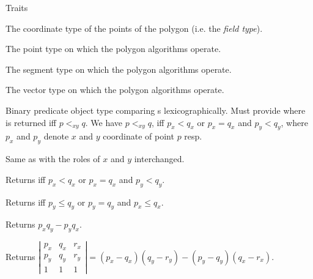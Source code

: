 \begin{ccClass} {Traits}

\ccTypes
{}
        {The coordinate type of the points of the polygon (i.e. the {\em field type}).}

        {The point type on which the polygon algorithms operate.}

        {The segment type on which the polygon algorithms operate.}

        {The vector type on which the polygon algorithms operate.}

       {Binary predicate object type comparing s lexicographically.
        Must provide  where 
        is returned iff $p <_{xy} q$.
        We have $p<_{xy}q$, iff $p_x < q_x$ or $p_x = q_x$ and $p_y < q_y$,
        where $p_x$ and $p_y$ denote $x$ and $y$ coordinate of point $p$ resp.
       }

       {Same as  with the roles of $x$ and $y$ interchanged.}

\ccCreation
{}



\ccOperations

{
Returns  iff $p_x < q_x$ or $p_x = q_x$ and $p_y < q_y$.
}

{
Returns  iff $p_y \leq q_y$ or $p_y = q_y$ and $p_x \leq q_x$.
}

{
Returns $p_x q_y - p_y q_x$.
}

{
Returns
$ \left|
  \begin{array}{ccc}
     p_x & q_x & r_x \\
     p_y & q_y & r_y \\
     1   & 1   & 1
  \end{array}
  \right|
  = (p_x-q_x)(q_y-r_y) - (p_y-q_y)(q_x-r_x).$
}


\end{ccClass}
